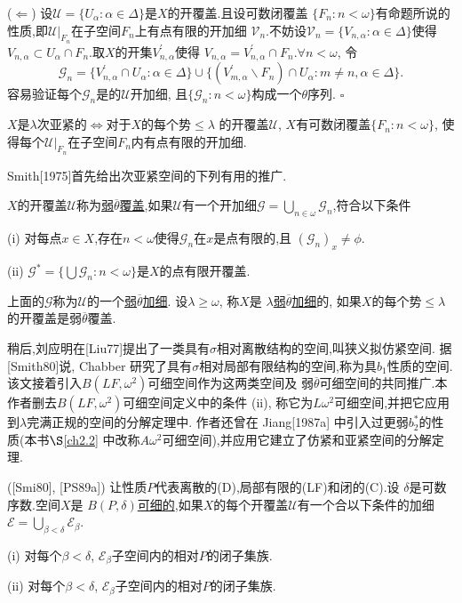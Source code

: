 \documentclass[main.tex]{subfiles}
\begin{document}
($\Leftarrow$) 设$\mathscr{U} = \{ U_\alpha: \alpha\in\Delta\}$是$X$的开覆盖.且设可数闭覆盖
$\{F_n:n<\omega\}$有命题所说的性质,即$\mathscr{U}|_{F_n}$在子空间$F_n$上有点有限的开加细
$\mathscr{V}_n$.不妨设$\mathscr{V}_n=\{V_{n,\alpha}:\alpha\in\Delta\}$使得
$V_{n,\alpha}\subset U_\alpha\cap F_n$.取$X$的开集$V_{n,\alpha}^\prime$使得
$V_{n,\alpha}=V_{n,\alpha}^\prime\cap F_n$.$\forall n<\omega$, 令
$$\mathscr{G}_n=\{V_{n,\alpha}^\prime\cap U_\alpha:\alpha\in\Delta\}
\cup\{(V_{m,\alpha}^\prime\backslash F_n)\cap U_\alpha: m\ne n, \alpha\in\Delta\}.$$
容易验证每个$\mathscr{G}_n$是的$\mathscr{U}$开加细,
且$\{\mathscr{G}_n:n<\omega\}$构成一个$\theta$序列.  $\square$

\begin{corollary}
$X$是$\lambda$次亚紧的$\Leftrightarrow$对于$X$的每个势$\le\lambda$
的开覆盖$\mathscr{U}$, $X$有可数闭覆盖$\{F_n:n<\omega\}$,
使得每个$\mathscr{U}|_{F_n}$在子空间$F_n$内有点有限的开加细.
\end{corollary}

Smith[1975]首先给出次亚紧空间的下列有用的推广.

\begin{definition}
$X$的开覆盖$\mathscr{U}$称为\underline{弱$\overline{\theta}$覆盖},如果$\mathscr{U}$有一个开加细$\mathscr{G}=\bigcup_{n\in\omega}\mathscr{G}_n$,符合以下条件

\textnormal{(i)} 对每点$x\in X$,存在$n<\omega$使得$\mathscr{G}_n$在$x$是点有限的,且
$(\mathscr{G}_n)_x \ne \phi$.

\textnormal{(ii)} $\mathscr{G}^* =\{\bigcup \mathscr{G}_n: n<\omega\}$是$X$的点有限开覆盖.

上面的$\mathscr{G}$称为$\mathscr{U}$的一个\underline{弱$\overline{\theta}$加细}.
设$\lambda\ge\omega$, 称$X$是 \underline{$\lambda$弱$\overline{\theta}$加细}的,
如果$X$的每个势$\le\lambda$的开覆盖是弱$\overline{\theta}$覆盖.
\end{definition}

稍后,刘应明在[Liu77]提出了一类具有$\sigma$相对离散结构的空间,叫狭义拟仿紧空间.
据[Smith80]说, Chabber 研究了具有$\sigma$相对局部有限结构的空间,称为具$b_1$性质的空间.
该文接着引入$B(LF,\omega^2)$可细空间作为这两类空间及
弱$\overline{\theta}$可细空间的共同推广.本作者删去$B(LF,\omega^2)$可细空间定义中的条件
 (ii), 称它为$L\omega^2$可细空间,并把它应用到$\lambda$完满正规的空间的分解定理中.
 作者还曾在 Jiang[1987a] 中引入过更弱$b_2^*$的性质(本书$\S$\ref{ch2.2} 中改称$A\omega^2$可细空间),并应用它建立了仿紧和亚紧空间的分解定理.

\begin{definition}
\textnormal{([Smi80], [PS89a])}	让性质$P$代表离散的\textnormal{(D)},局部有限的\textnormal{(LF)}和闭的\textnormal{(C)}.设
$\delta$是可数序数.空间$X$是
\underline{$B(P,\delta)$可细的},如果$X$的每个开覆盖$\mathscr{U}$有一个合以下条件的加细
$\mathscr{E}=\bigcup_{\beta<\delta}\mathscr{E}_\beta$.

\textnormal{(i)} 对每个$\beta<\delta$, $\mathscr{E}_\beta$子空间内的相对$P$的闭子集族.

\textnormal{(ii)} 对每个$\beta<\delta$, $\mathscr{E}_\beta$子空间内的相对$P$的闭子集族.
\end{definition}
\end{document}
